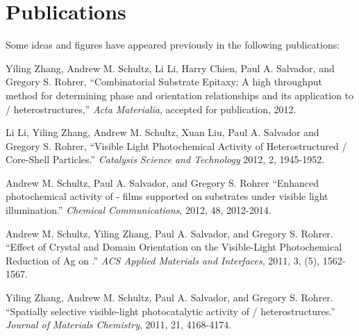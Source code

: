 
\chapter*{Publications}

Some ideas and figures have appeared previously in the following publications:



\begin{items}

\item Yiling Zhang, Andrew M. Schultz, Li Li, Harry Chien, Paul A. Salvador, and Gregory S. Rohrer, ``Combinatorial Substrate Epitaxy: A high throughput method for determining phase and orientation relationships and its application to / heterostructures,'' \emph{Acta Materialia}, accepted for publication, 2012.

\item Li Li, Yiling Zhang, Andrew M. Schultz, Xuan Liu, Paul A. Salvador and Gregory S. Rohrer, ``Visible Light Photochemical Activity of Heterostructured / Core-Shell Particles.'' \emph{Catalysis Science and Technology} 2012, 2, 1945-1952.

\item Andrew M. Schultz, Paul A. Salvador, and Gregory S. Rohrer ``Enhanced photochemical activity of \textalpha- films supported on  substrates under visible light illumination.'' \emph{Chemical Communications}, 2012, 48, 2012-2014.

\item Andrew M. Schultz, Yiling Zhang, Paul A. Salvador, and Gregory S. Rohrer. ``Effect of Crystal and Domain Orientation on the Visible-Light Photochemical Reduction of Ag on .'' \emph{ACS Applied Materials and Interfaces}, 2011, 3, (5), 1562-1567.


\item Yiling Zhang, Andrew M. Schultz, Paul A. Salvador, and Gregory S. Rohrer. ``Spatially selective visible-light photocatalytic activity of / heterostructures.'' \emph{Journal of Materials Chemistry}, 2011, 21, 4168-4174.

\end{items}

